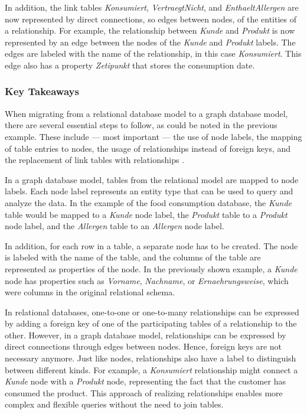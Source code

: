 In addition, the link tables \textit{Konsumiert}, \textit{VertraegtNicht}, and \textit{EnthaeltAllergen} are now represented by direct connections, so edges between nodes, of the entities of a relationship. For example, the relationship between \textit{Kunde} and \textit{Produkt} is now represented by an edge between the nodes of the \textit{Kunde} and \textit{Produkt} labels. The edges are labeled with the name of the relationship, in this case \textit{Konsumiert}. This edge also has a property \textit{Zetipunkt} that stores the consumption date.

\subsubsection*{Key Takeaways}

When migrating from a relational database model to a graph database model, there are several essential steps to follow, as could be noted in the previous example. These include --- most important --- the use of node labels, the mapping of table entries to nodes, the usage of relationships instead of foreign keys, and the replacement of link tables with relationships \parencite{neo4j_docs_migration}.

In a graph database model, tables from the relational model are mapped to node labels. Each node label represents an entity type that can be used to query and analyze the data. In the example of the food consumption database, the \textit{Kunde} table would be mapped to a \textit{Kunde} node label, the \textit{Produkt} table to a \textit{Produkt} node label, and the \textit{Allergen} table to an \textit{Allergen} node label.

In addition, for each row in a table, a separate node has to be created. The node is labeled with the name of the table, and the columns of the table are represented as properties of the node. In the previously shown example, a \textit{Kunde} node has properties such as \textit{Vorname}, \textit{Nachname}, or \textit{Ernaehrungsweise}, which were columns in the original relational schema.

In relational databases, one-to-one or one-to-many relationships can be expressed by adding a foreign key of one of the participating tables of a relationship to the other. However, in a graph database model, relationships can be expressed by direct connections through edges between nodes. Hence, foreign keys are not necessary anymore. Just like nodes, relationships also have a label to distinguish between different kinds. For example, a \textit{Konsumiert} relationship might connect a \textit{Kunde} node with a \textit{Produkt} node, representing the fact that the customer has consumed the product. This approach of realizing relationships enables more complex and flexible queries without the need to join tables.

